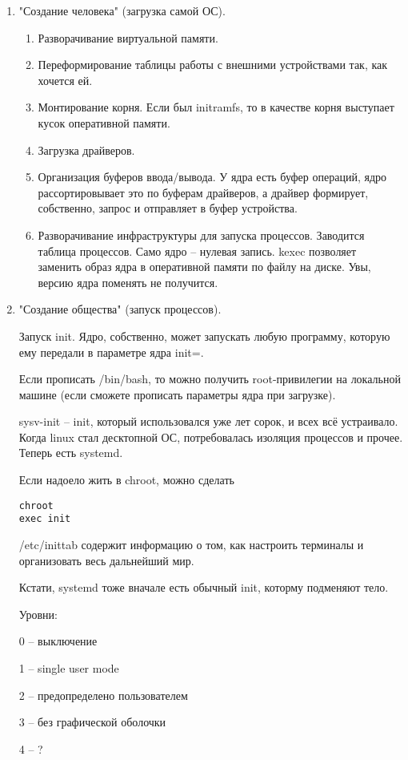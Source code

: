 \documentclass[a4paper,10pt]{article}
\begin{document}
\begin{enumerate}
\item "Создание человека" (загрузка самой ОС).
\begin{enumerate}
\item Разворачивание виртуальной памяти.
\item Переформирование таблицы работы с внешними устройствами так, как хочется ей. 
\item Монтирование корня. Если был initramfs, то в качестве корня выступает кусок оперативной памяти.
\item Загрузка драйверов.
\item Организация буферов ввода/вывода. У ядра есть буфер операций, ядро рассортировывает это по буферам драйверов, а драйвер формирует, собственно, запрос и отправляет в буфер устройства.
\item Разворачивание инфраструктуры для запуска процессов. Заводится таблица процессов. Само ядро -- нулевая запись.
kexec позволяет заменить образ ядра в оперативной памяти по файлу на диске. Увы, версию ядра поменять не получится.
\end{enumerate}

\item "Создание общества" (запуск процессов).

Запуск init. Ядро, собственно, может запускать любую программу, которую ему передали в параметре ядра init=.

Если прописать /bin/bash, то можно получить root-привилегии на локальной машине (если сможете прописать параметры ядра при загрузке).

sysv-init -- init, который использовался уже лет сорок, и всех всё устраивало. Когда linux стал десктопной ОС, потребовалась изоляция процессов и прочее. Теперь есть systemd.

Если надоело жить в chroot, можно сделать 
\begin{verbatim}
chroot
exec init 
\end{verbatim}
/etc/inittab содержит информацию о том, как настроить терминалы и организовать весь дальнейший мир.

Кстати, systemd тоже вначале есть обычный init, которму подменяют тело.

Уровни:

0 -- выключение

1 -- single user mode

2 -- предопределено пользователем

3 -- без графической оболочки

4 -- ?


\end{enumerate}
\end{document}

